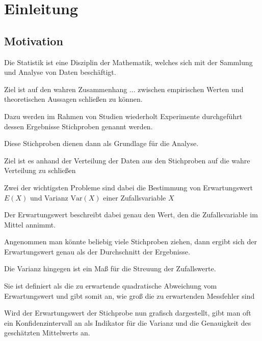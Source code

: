 \chapter{Einleitung}
\cite{AndersonDarling}
\cite{Babu}
\cite{Banks} %
\cite{Cheng1983} %
\cite{Cheng1987} %
\cite{Cheng2002} 
\cite{Cheng2005}
\cite{Cheng2015}
\cite{Chernick} %
\cite{Cox} %
\cite{DAgostino} %
\cite{DavisonHinkley} %
\cite{Hall1987}
\cite{Law} %
\cite{Miller} %
\cite{KanofskySrinivasan} %
\cite{SrinivasanWharton} %
\cite{Stute}
\cite{Efron1979}
\cite{Efron1986}

\section{Motivation}

Die Statistik ist eine Disziplin der Mathematik, welches sich mit der Sammlung und Analyse von Daten beschäftigt.

Ziel ist auf den wahren Zusammenhang ... zwischen empirischen Werten und theoretischen Aussagen schließen zu können.

Dazu werden im Rahmen von Studien wiederholt Experimente durchgeführt dessen Ergebnisse Stichproben genannt werden.

Diese Stichproben dienen dann als Grundlage für die Analyse. 

Ziel ist es anhand der Verteilung der Daten aus den Stichproben auf die wahre Verteilung zu schließen

Zwei der wichtigsten Probleme sind dabei die Bestimmung von Erwartungswert $E(X)$ und Varianz $\mathrm{Var}(X)$ einer Zufallsvariable $X$ 

Der Erwartungswert beschreibt dabei genau den Wert, den die Zufallsvariable im Mittel annimmt. 

Angenommen man könnte beliebig viele Stichproben ziehen, dann ergibt sich der Erwartungswert genau als der Durchschnitt der Ergebnisse.

Die Varianz hingegen ist ein Maß für die Streuung der Zufallswerte. 

Sie ist definiert als die zu erwartende quadratische Abweichung vom Erwartungswert und gibt somit an, wie groß die zu erwartenden Messfehler sind

Wird der Erwartungswert der Stichprobe nun grafisch dargestellt, gibt man oft ein Konfidenzintervall an als Indikator für die Varianz und die Genauigkeit des geschätzten Mittelwerts an.

